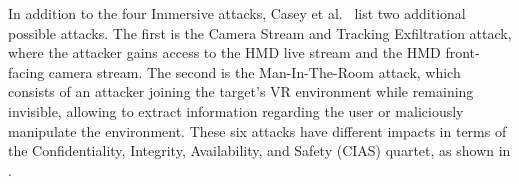\documentclass[journal]{IEEEtran}
\newcommand{\xmark}{\textcolor{red}{\ding{55}}}%
\begin{document}

In addition to the four Immersive attacks, Casey et al.~\cite{casey2019} list two additional possible attacks. The first is the Camera Stream and Tracking Exfiltration attack, where the attacker gains access to the HMD live stream and the HMD front-facing camera stream. The second is the Man-In-The-Room attack, which consists of an attacker joining the target's VR environment while remaining invisible, allowing to extract information regarding the user or maliciously manipulate the environment. These six attacks have different impacts in terms of the Confidentiality, Integrity, Availability, and Safety (CIAS) quartet, as shown in .

\begin{table*}[t]
\centering
\normalsize
\renewcommand\arraystretch{1.4}
\caption{VR-Specific Attacks and their Impact in terms of the CIAS Quartet}
\label{tab:specattacks}
\end{table*}
\end{document}
